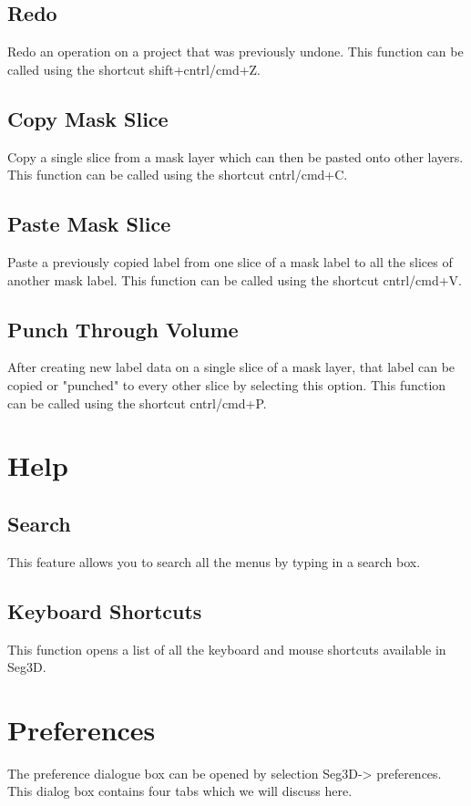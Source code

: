 \documentclass[fleqn,11pt,openany]{book}
\begin{document}
\subsection{Redo}
Redo an operation on a project that was previously undone. This function can be called using the shortcut shift+cntrl/cmd+Z.


\subsection{Copy Mask Slice}
\label{sec:copy}
Copy a single slice from a mask layer which can then be pasted onto other layers. This function can be called using the shortcut cntrl/cmd+C.


\subsection{Paste Mask Slice}
\label{sec:paste}
Paste a previously copied label from one slice of a mask label to all the slices of another mask label. This function can be called using the shortcut cntrl/cmd+V.


\subsection{Punch Through Volume}
\label{sec:punch}
After creating new label data on a single slice of a mask layer, that label can be copied or "punched" to every other slice by
selecting this option. This function can be called using the shortcut cntrl/cmd+P.


\section{Help}
\subsection{Search}
This feature allows you to search all the menus by typing in a search box.

\subsection{Keyboard Shortcuts}
This function opens a list of all the keyboard and mouse shortcuts available in Seg3D.

\section{Preferences}
\label{sec:preferences}
The preference dialogue box can be opened by selection Seg3D-> preferences.  This dialog box
contains four tabs which we will discuss here.
\end{document}
